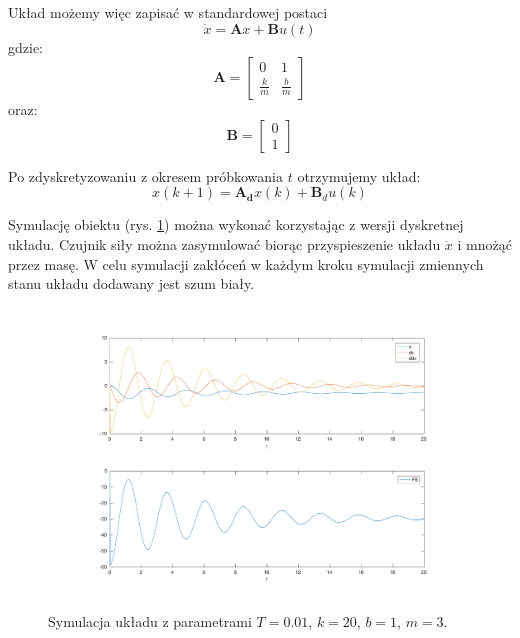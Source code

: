 \documentclass[a4paper]{article}
\begin{document}
Układ możemy więc zapisać w standardowej postaci
\begin{equation}
\dot{x} = \textbf{A}x + \textbf{B}u(t)
\end{equation}
gdzie:
\begin{equation}
\mathbf{A} = 	\begin{bmatrix}
	    0 & 1 \\
	    \frac{k}{m} & \frac{b}{m}
	\end{bmatrix}
\end{equation}
oraz:
\begin{equation}
\mathbf{B} = \begin{bmatrix}
	    0 \\
	    1
	\end{bmatrix}
\end{equation}

Po zdyskretyzowaniu z okresem próbkowania $t$ otrzymujemy układ:
\begin{equation}
x(k+1) = \mathbf{A_d}x(k) + \mathbf{B}_du(k)
\label{eq:dyskretny}
\end{equation}


Symulację obiektu (rys. \ref{fig:system}) można wykonać korzystając z wersji dyskretnej układu. Czujnik siły można zasymulować biorąc przyspieszenie układu $\ddot{x}$ i mnożąć przez masę. W celu symulacji zakłóceń w każdym kroku symulacji zmiennych stanu układu dodawany jest szum biały.

\begin{figure}[H]
	\includegraphics[width=0.99\linewidth]{system_sys}
	\centering
	\caption{Symulacja układu z parametrami $T=0.01$, $k = 20$, $b = 1$, $m = 3$.}
	\label{fig:system}
\end{figure}
\end{document}
